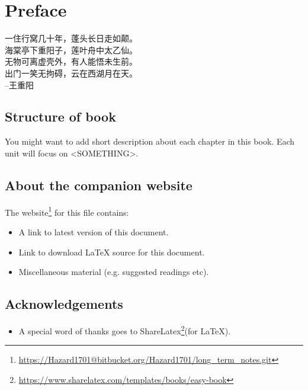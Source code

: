 \chapter*{Preface}
\begin{center}
{\kaishu
一住行窝几十年，蓬头长日走如颠。\\
海棠亭下重阳子，莲叶舟中太乙仙。\\
无物可离虚壳外，有人能悟未生前。\\
出门一笑无拘碍，云在西湖月在天。\\
\hfill--王重阳
}
\end{center}


\section*{Structure of book}
You might want to add short description about each chapter in this book.
Each unit will focus on <SOMETHING>.

\section*{About the companion website}
The website\footnote{\url{https://Hazard1701@bitbucket.org/Hazard1701/long_term_notes.git}} for this file contains:
\begin{itemize}
  \item A link to latest version of this document.
  \item Link to download LaTeX source for this document.
  \item Miscellaneous material (e.g. suggested readings etc).
\end{itemize}

\section*{Acknowledgements}
\begin{itemize}
\item A special word of thanks goes to ShareLatex\footnote{\url{https://www.sharelatex.com/templates/books/easy-book}}(for \LaTeX{}).
\end{itemize}
